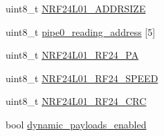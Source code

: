 \begin{DoxyCompactItemize}
uint8\+\_\+t \hyperlink{classNRF24L01_a0b5c60487c6b715b9f17f968f7958d93}{N\+R\+F24\+L01\+\_\+\+A\+D\+D\+R\+S\+I\+ZE}
\item 
uint8\+\_\+t \hyperlink{classNRF24L01_af836ff0a915587aa40b5eabe4101ea4c}{pipe0\+\_\+reading\+\_\+address} \mbox{[}5\mbox{]}
\item 
uint8\+\_\+t \hyperlink{classNRF24L01_ac798ba6ce52fd4a13eb40ff274818157}{N\+R\+F24\+L01\+\_\+\+R\+F24\+\_\+\+PA}
\item 
uint8\+\_\+t \hyperlink{classNRF24L01_a2dc0073a56f6aca86da205dd720fd132}{N\+R\+F24\+L01\+\_\+\+R\+F24\+\_\+\+S\+P\+E\+ED}
\item 
uint8\+\_\+t \hyperlink{classNRF24L01_af6a260dd55ee5c2f7de7cfac4e91178d}{N\+R\+F24\+L01\+\_\+\+R\+F24\+\_\+\+C\+RC}
\item 
bool \hyperlink{classNRF24L01_ae319d1b6a3d950888d2608cc69efb07c}{dynamic\+\_\+payloads\+\_\+enabled}
\end{DoxyCompactItemize}
